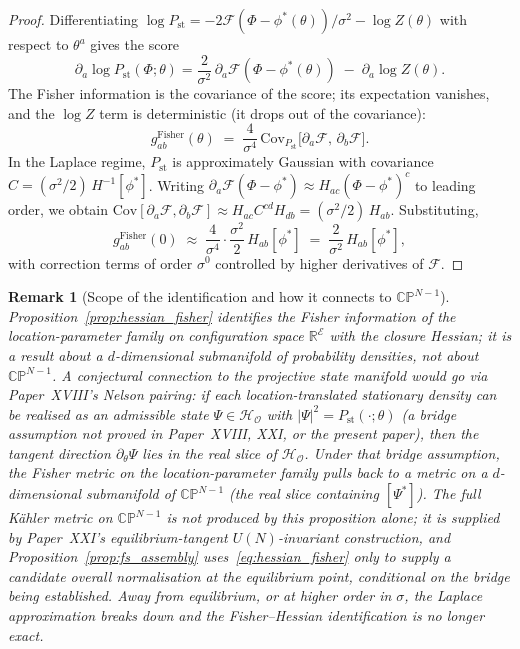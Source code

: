 \documentclass[12pt]{article}
\newtheorem{remark}[theorem]{Remark}
\newcommand{\Ecal}{\mathcal{E}}
\newcommand{\Fcal}{\mathcal{F}}
\newcommand{\Ocal}{\mathcal{O}}
\newcommand{\Hcal}{\mathcal{H}}
\newcommand{\Pst}{P_{\mathrm{st}}}
\begin{document}
\begin{proof}
Differentiating $\log\Pst = -2\Fcal(\Phi - \phi^*(\theta))/\sigma^2 - \log Z(\theta)$ with respect to $\theta^a$ gives the score
\begin{equation}
    \partial_a \log\Pst(\Phi;\theta)
    = \frac{2}{\sigma^2}\,\partial_a \Fcal(\Phi - \phi^*(\theta))
    \;-\; \partial_a \log Z(\theta).
\end{equation}
The Fisher information is the covariance of the score; its expectation vanishes, and the $\log Z$ term is deterministic (it drops out of the covariance):
\begin{equation}
    g^{\mathrm{Fisher}}_{ab}(\theta)
    \;=\; \frac{4}{\sigma^4}\, \mathrm{Cov}_{\Pst}\!\bigl[\partial_a \Fcal,\, \partial_b \Fcal\bigr].
\end{equation}
In the Laplace regime, $\Pst$ is approximately Gaussian with covariance $C = (\sigma^2/2)\,H^{-1}[\phi^*]$. Writing $\partial_a\Fcal(\Phi - \phi^*) \approx H_{ac}(\Phi - \phi^*)^c$ to leading order, we obtain $\mathrm{Cov}[\partial_a\Fcal, \partial_b\Fcal] \approx H_{ac} C^{cd} H_{db} = (\sigma^2/2)\,H_{ab}$. Substituting,
\begin{equation}
    g^{\mathrm{Fisher}}_{ab}(0) \;\approx\; \frac{4}{\sigma^4} \cdot \frac{\sigma^2}{2}\, H_{ab}[\phi^*] \;=\; \frac{2}{\sigma^2}\, H_{ab}[\phi^*],
\end{equation}
with correction terms of order $\sigma^0$ controlled by higher derivatives of $\Fcal$.
\end{proof}

\begin{remark}[Scope of the identification and how it connects to $\mathbb{CP}^{N-1}$]\label{rem:hessian_scope}
Proposition~\ref{prop:hessian_fisher} identifies the Fisher information of the location-parameter family on configuration space $\mathbb{R}^\Ecal$ with the closure Hessian; it is a result about a $d$-dimensional submanifold of probability densities, not about $\mathbb{CP}^{N-1}$. A conjectural connection to the projective state manifold would go via Paper~XVIII's Nelson pairing: \emph{if} each location-translated stationary density can be realised as an admissible state $\Psi \in \Hcal_\Ocal$ with $|\Psi|^2 = \Pst(\cdot;\theta)$ (a bridge assumption not proved in Paper~XVIII, XXI, or the present paper), then the tangent direction $\partial_\theta \Psi$ lies in the real slice of $\Hcal_\Ocal$. Under that bridge assumption, the Fisher metric on the location-parameter family pulls back to a metric on a $d$-dimensional submanifold of $\mathbb{CP}^{N-1}$ (the real slice containing $[\Psi^*]$). The full K\"ahler metric on $\mathbb{CP}^{N-1}$ is \emph{not} produced by this proposition alone; it is supplied by Paper~XXI's equilibrium-tangent $U(N)$-invariant construction, and Proposition~\ref{prop:fs_assembly} uses~\eqref{eq:hessian_fisher} only to supply a \emph{candidate} overall normalisation at the equilibrium point, conditional on the bridge being established. Away from equilibrium, or at higher order in $\sigma$, the Laplace approximation breaks down and the Fisher--Hessian identification is no longer exact.
\end{remark}
\end{document}
